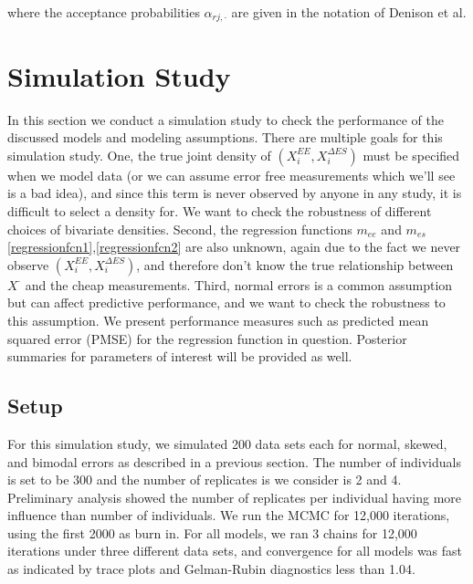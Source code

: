 \documentclass[11pt]{article}\usepackage[]{graphicx}\usepackage[]{color}
\begin{document}
where the acceptance probabilities $\alpha_{rj,\cdot}$ are given in the notation of Denison et al.

\section{Simulation Study}

In this section we conduct a simulation study to check the performance of the discussed models and modeling assumptions. There are multiple goals for this simulation study. One, the true joint density of $(X_i^{EE},X_i^{\Delta ES})$ must be specified when we model data (or we can assume error free measurements which we'll see is a bad idea), and since this term is never observed by anyone in any study, it is difficult to select a density for. We want to check the robustness of different choices of bivariate densities. Second, the regression functions $m_{ee}$ and $m_{es}$ \eqref{regressionfcn1},\eqref{regressionfcn2} are also unknown, again due to the fact we never observe $(X_i^{EE},X_i^{\Delta ES})$, and therefore don't know the true relationship between $X^{\cdot}$ and the cheap measurements. Third, normal errors  is a common assumption but  can affect predictive performance, and we want to check the robustness to this assumption. We present performance measures such as predicted mean squared error (PMSE) for the regression function in question. Posterior summaries for parameters of interest will be provided as well. 


\subsection{Setup}

For this simulation study, we simulated 200 data sets each for normal, skewed, and bimodal errors as described in a previous section. The number of individuals is set to be 300 and the number of replicates is we consider is 2 and 4. Preliminary analysis showed the number of replicates per individual having  more influence than number of individuals. We run the MCMC for 12,000 iterations, using the first 2000 as burn in. For all models, we ran 3 chains for 12,000 iterations under three different data sets, and convergence for all models was fast as indicated by trace plots and Gelman-Rubin diagnostics less than 1.04.
\end{document}
